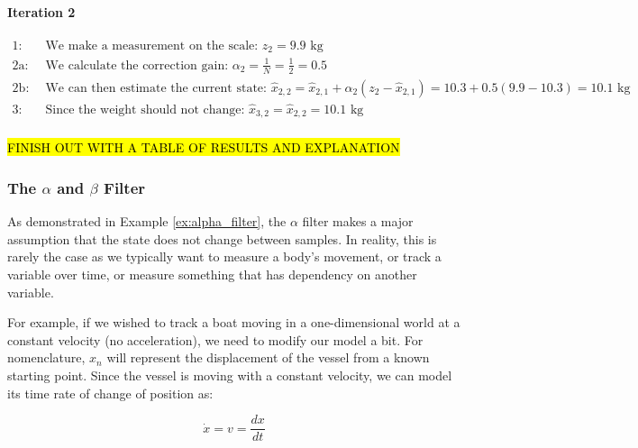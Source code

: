 \begin{example}
        \paragraph{Iteration 2}
        \begin{equation*}
            \begin{aligned} 
                1:& \text{ We make a measurement on the scale: } z_2 = 9.9 \text{ kg} \\
                2\text{a}:& \text{ We calculate the correction gain: } \alpha_2 = \frac{1}{N} = \frac{1}{2} = 0.5 \\
                2\text{b}:& \text{ We can then estimate the current state: } \hat{x}_{2,2} = \hat{x}_{2,1} + \alpha_2(z_2 - \hat{x}_{2,1}) = 10.3 + 0.5(9.9 - 10.3) = 10.1 \text{ kg} \\
                3:& \text{ Since the weight should not change: } \hat{x}_{3,2} = \hat{x}_{2,2} = 10.1 \text{ kg} \\
            \end{aligned}
        \end{equation*}

        \hl{FINISH OUT WITH A TABLE OF RESULTS AND EXPLANATION}

        \end{example}


        \subsubsection*{The $\alpha$ and $\beta$ Filter}
        As demonstrated in Example \ref{ex:alpha_filter}, the $\alpha$ filter makes a major assumption that the state does not change between samples.
        In reality, this is rarely the case as we typically want to measure a body's movement, or track a variable over time, or measure something that has dependency on another variable.
        
        For example, if we wished to track a boat moving in a one-dimensional world at a constant velocity (no acceleration), we need to modify our model a bit.
        For nomenclature, $x_n$ will represent the displacement of the vessel from a known starting point.
        Since the vessel is moving with a constant velocity, we can model its time rate of change of position as:
        
        \begin{equation*}
            \dot{x} = v = \frac{dx}{dt}
        \end{equation*}

